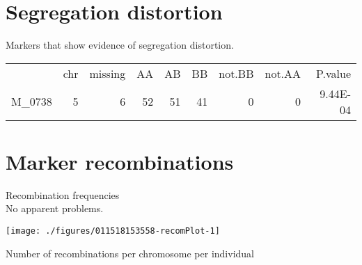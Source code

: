 \documentclass[a4paper,11pt]{article}\usepackage[]{graphicx}\usepackage[]{color}
\newenvironment{knitrout}{}{} %
\begin{document}
\section{Segregation distortion}
Markers that show evidence of segregation distortion.
\begin{table}[ht]
\begin{flushleft}
\begin{tabular}{lrrrrrrrr}
  & chr & missing & AA & AB & BB & not.BB & not.AA & P.value \\ 
 M\_0738 & 5 & 6 & 52 & 51 & 41 & 0 & 0 & 9.44E-04 \\ 
  \end{tabular}
\label{segrDist}
\end{flushleft}
\end{table}

\clearpage
\section{Marker recombinations}
Recombination frequencies\\
No apparent problems.

\begin{knitrout}
\color{fgcolor}
\texttt{[image: ./figures/011518153558-recomPlot-1]} 

\end{knitrout}
\newpage
Number of recombinations per chromosome per individual
\end{document}
